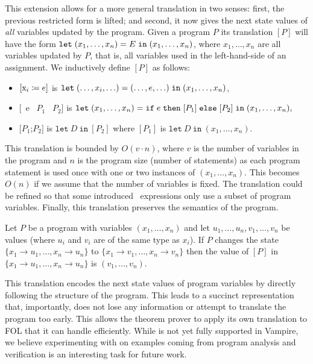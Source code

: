 This extension allows for a more general translation in two senses:
first, the previous restricted form is lifted; and second, it now
gives the next state values of {\it all} variables updated by the program. Given a program $P$ its translation $[P]$ will have the form $\mathtt{let}\;{(x_1,\ldots,x_n)}={E}\;\allowbreak\mathtt{in}\;{(x_1,\ldots,x_n)}$, where $x_1,\ldots,x_n$ are all variables updated by $P$, that is, all variables used in the left-hand-side of an assignment. We inductively define $[P]$ as follows:
\begin{itemize}
	\item $[\text{x}_i \text{$\;\coloneqq\;$} e]$ is $\mathtt{let}\;{(\ldots,x_i,\ldots)}={(\ldots,e,\ldots)}\;\allowbreak\mathtt{in}\;{(x_1,\ldots,x_n)}$,
	\item $[$\IF\ e \THEN\ $P_1$ \ELSE\ $P_2]$ is $\mathtt{let}\;{(x_1,\ldots,x_n)}={\mathtt{if}\;{e}\;\allowbreak\mathtt{then}\;{[P_1]}\;\allowbreak\mathtt{else}\;{[P_2]}}\;\allowbreak\mathtt{in}\;{(x_1,\ldots,x_n)},$
	\item $[P_1$;\;$P_2]$ is $\mathtt{let}~D~\mathtt{in}~[P_2]$ where $[P_1]$ is $\mathtt{let}~D~\mathtt{in}~(x_1,\ldots,x_n)$.
\end{itemize}
This translation is bounded by $O(v\cdot n)$, where $v$ is the number
of variables in the program and $n$ is the program size (number of
statements) as each program statement is used once with one or two
instances of $(x_1,\ldots,x_n)$.
This becomes $O(n)$ if we assume that the number of
variables is fixed. The translation could be refined so that some introduced  \LETIN\
expressions only use a subset of program variables.
Finally, this translation preserves the semantics
of the program.

\begin{theorem}\rm
  Let $P$ be a program with variables $(x_1,\ldots,x_n)$ and let $u_1,\ldots,u_n, v_1, \ldots, v_n$ be values (where $u_i$ and $v_i$ are of the same type as $x_i$). If $P$ changes the state $\{x_1\to u_1,\ldots,x_n\to u_n\}$ to $\{x_1\to v_1,\ldots,x_n\to v_n\}$ then the value of $[P]$ in $\{x_1\to u_1,\ldots,x_n\to u_n\}$ is $(v_1,\ldots,v_n)$.
\end{theorem}

This translation encodes the next state values of program variables by
directly following the structure of the program. This leads to a
succinct representation that, importantly, does not lose any
information or attempt to translate the program too early. This allows
the theorem prover to apply its own translation to FOL that it can
handle efficiently.   While \foolp{} is not yet fully supported in
Vampire, we believe experimenting with \foolp{} on
examples coming from program analysis and verification is an
interesting task for future work.



